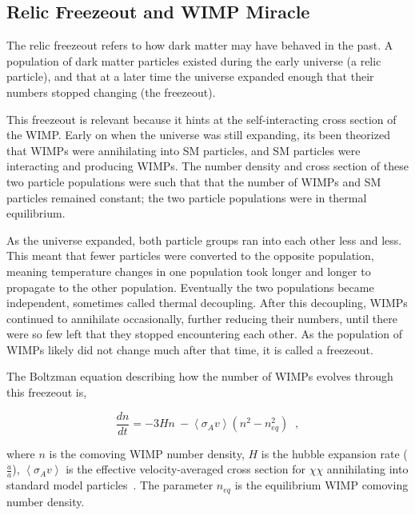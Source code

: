 \subsection{Relic Freezeout and WIMP Miracle}

The relic freezeout refers to how dark matter may have behaved in the past.
A population of dark matter particles existed during the early universe (a relic particle), and that at a later time the universe expanded enough that their numbers stopped changing (the freezeout).

This freezeout is relevant because it hints at the self-interacting cross section of the WIMP.
Early on when the universe was still expanding, its been theorized that WIMPs were annihilating into SM particles, and SM particles were interacting and producing WIMPs.
The number density and cross section of these two particle populations were such that that the number of WIMPs and SM particles remained constant; the two particle populations were in thermal equilibrium.

As the universe expanded, both particle groups ran into each other less and less.
This meant that fewer particles were converted to the opposite population, meaning temperature changes in one population took longer and longer to propagate to the other population.
Eventually the two populations became independent, sometimes called thermal decoupling.
After this decoupling, WIMPs continued to annihilate occasionally, further reducing their numbers, until there were so few left that they stopped encountering each other.
As the population of WIMPs likely did not change much after that time, it is called a freezeout.

The Boltzman equation describing how the number of WIMPs evolves through this freezeout is,

\begin{equation}\label{eqn:boltzmann_relic}
  \frac{dn}{dt} = - 3 H n \: - \left \langle \sigma_{A} v \right \rangle \left ( n^2 - n_{eq}^2 \right ) \;\;,
\end{equation}

where $n$ is the comoving WIMP number density, $H$ is the hubble expansion rate ($\frac{\dot{a}}{a}$), $\left \langle \sigma_{A} v \right \rangle$ is the effective velocity-averaged cross section for $\chi\chi$ annihilating into standard model particles~\cite{wells_relic}.
The parameter $n_{eq}$ is the equilibrium WIMP comoving number density.

